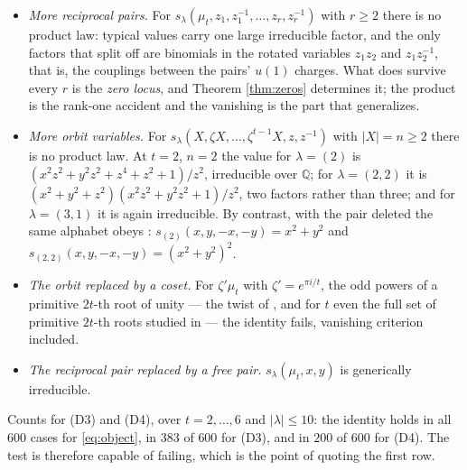 \documentclass[11pt,reqno]{amsart}
\theoremstyle{plain}
\theoremstyle{definition}
\newcommand{\zt}{\mu_t}
\begin{document}
\begin{itemize}
\item[\rm(D1)] \emph{More reciprocal pairs.} For $s_\lambda(\zt,z_1,z_1^{-1},\dots,z_r,z_r^{-1})$
with $r\ge2$ there is no product law: typical values carry one large irreducible factor, and the only
factors that split off are binomials in the rotated variables $z_1z_2$ and $z_1z_2^{-1}$, that is,
the couplings between the pairs' $u(1)$ charges. What does survive every $r$ is the \emph{zero
locus}, and Theorem \ref{thm:zeros} determines it; the product is the rank-one accident and the
vanishing is the part that generalizes.
\item[\rm(D2)] \emph{More orbit variables.} For $s_\lambda(X,\zeta X,\dots,\zeta^{t-1}X,z,z^{-1})$
with $|X|=n\ge2$ there is no product law. At $t=2$, $n=2$ the value for $\lambda=(2)$ is
$(x^2z^2+y^2z^2+z^4+z^2+1)/z^2$, irreducible over $\mathbb Q$; for $\lambda=(2,2)$ it is
$(x^2+y^2+z^2)(x^2z^2+y^2z^2+1)/z^2$, two factors rather than three; and for $\lambda=(3,1)$ it is
again irreducible. By contrast, with the pair deleted the same alphabet obeys \cite[Theorem
2.3]{AK25}: $s_{(2)}(x,y,-x,-y)=x^2+y^2$ and $s_{(2,2)}(x,y,-x,-y)=(x^2+y^2)^2$.
\item[\rm(D3)] \emph{The orbit replaced by a coset.} For $\zeta'\zt$ with $\zeta'=e^{\pi i/t}$, the
odd powers of a primitive $2t$-th root of unity --- the twist of \cite[\S3]{AK25}, and for $t$ even
the full set of primitive $2t$-th roots studied in \cite{HI24} --- the identity fails, vanishing
criterion included.
\item[\rm(D4)] \emph{The reciprocal pair replaced by a free pair.} $s_\lambda(\zt,x,y)$ is
generically irreducible.
\end{itemize}

Counts for (D3) and (D4), over $t=2,\dots,6$ and $|\lambda|\le10$: the identity holds in all $600$
cases for \eqref{eq:object}, in $383$ of $600$ for (D3), and in $200$ of $600$ for (D4). The test is
therefore capable of failing, which is the point of quoting the first row.
\end{document}
